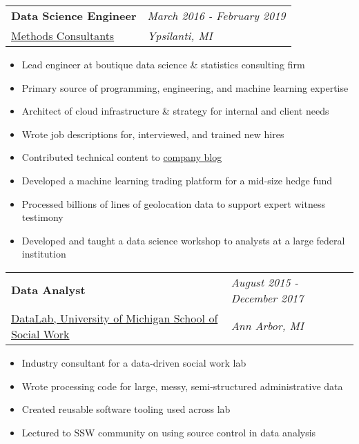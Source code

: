 \documentclass[margin,line]{res}
\begin{document}
\begin{resume}
\begin{tabular}{p{4.4in} l}
  {\bf Data Science Engineer} & \emph{March 2016 - February 2019}\\
  \href{https://www.methodsconsultants.com/}{Methods Consultants} & \emph{Ypsilanti, MI}
\end{tabular}
\vspace{2pt}
\begin{itemize}\itemsep -2pt
  \item Lead engineer at boutique data science \& statistics consulting firm
  \item Primary source of programming, engineering, and machine learning expertise
  \item Architect of cloud infrastructure \& strategy for internal and client needs
  \item Wrote job descriptions for, interviewed, and trained new hires
  \item Contributed technical content to \href{https://blog.methodsconsultants.com}{company blog}
  \item Developed a machine learning trading platform for a mid-size hedge fund
  \item Processed billions of lines of geolocation data to support expert witness testimony
  \item Developed and taught a data science workshop to analysts at a large federal institution
\end{itemize}

\begin{tabular}{p{4.4in} l}
  {\bf Data Analyst} & \emph{August 2015 - December 2017}\\
  \href{https://www.ssw-datalab.org/}{DataLab, University of Michigan School of Social Work} & \emph{Ann Arbor, MI}
\end{tabular}
\vspace{2pt}
\begin{itemize}\itemsep -2pt
  \item Industry consultant for a data-driven social work lab
  \item Wrote processing code for large, messy, semi-structured administrative data
  \item Created reusable software tooling used across lab
  \item Lectured to SSW community on using source control in data analysis
\end{itemize}


\end{resume}
\end{document}
